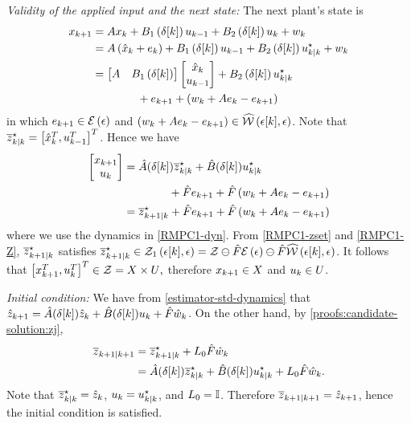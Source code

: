 \noindent\textit{Validity of the applied input and the next state:}
%
The next plant's state is 
\begin{align*}
x_{k+1} & =Ax_{k}+B_{1}\left(\delta[k]\right)u_{k-1}+B_{2}\left(\delta[k]\right)u_{k}+w_{k}\\
 & =A\left(\hat{x}_{k}+e_{k}\right)+B_{1}\left(\delta[k]\right)u_{k-1}+B_{2}\left(\delta[k]\right)u_{k| k}^{\star}+w_{k}\\
 & =\begin{bmatrix}A & B_{1}\left(\delta[k]\right)\end{bmatrix}\begin{bmatrix}\hat{x}_{k}\\
u_{k-1}
\end{bmatrix}+B_{2}\left(\delta[k]\right)u_{k| k}^{\star} \\
&\qquad\qquad + e_{k+1}+\left(w_{k}+Ae_{k}-e_{k+1}\right)
\end{align*}
in which $e_{k+1}\in\mathcal{E}\left(\epsilon\right)$ and $\left(w_{k}+Ae_{k}-e_{k+1}\right)\in\widehat{\mathcal{W}}\left(\epsilon[k],\epsilon\right)$.
Note that $\overline{z}_{k| k}^{\star}=\left[\hat{x}_{k}^{T},u_{k-1}^{T}\right]^{T}$.
Hence we have
\begin{align*}
\begin{bmatrix}x_{k+1}\\
u_{k}
\end{bmatrix} & =\hat{A}(\delta[k])\overline{z}_{k| k}^{\star}+\hat{B}(\delta[k])u_{k| k}^{\star}\\
&\qquad\qquad +\hat{F}e_{k+1}+\hat{F}\left(w_{k}+Ae_{k}-e_{k+1}\right)\\
 & =\overline{z}_{k+1| k}^{\star}+\hat{F}e_{k+1}+\hat{F}\left(w_{k}+Ae_{k}-e_{k+1}\right)
\end{align*}
where we use the dynamics in \eqref{RMPC1-dyn}. From \eqref{RMPC1-zset}
and \eqref{RMPC1-Z}, $\overline{z}_{k+1| k}^{\star}$ satisfies $\overline{z}_{k+1| k}^{\star}\in\mathcal{Z}_{1}\left(\epsilon[k],\epsilon\right)=\mathcal{Z}\ominus\hat{F}\mathcal{E}\left(\epsilon\right)\ominus\hat{F}\widehat{\mathcal{W}}\left(\epsilon[k],\epsilon\right)$.
It follows that
\(
\left[ x_{k+1}^{T}, u_{k}^{T} \right]^{T} \in \mathcal{Z} = X\times U\text{,}
\)
therefore  $x_{k+1}\in X$ and $u_{k}\in U$.


\noindent\textit{Initial condition:}
%
We have from \eqref{estimator-std-dynamics} that $\hat{z}_{k+1}=\hat{A}(\delta[k])\hat{z}_{k}+\hat{B}(\delta[k])u_{k}+\hat{F}\hat{w}_{k}$.
On the other hand, by \eqref{proofs:candidate-solution:zj},
\begin{align*}
\overline{z}_{k+1| k+1} & =\overline{z}_{k+1| k}^{\star}+L_{0}\hat{F}\hat{w}_{k}\\
 & =\hat{A}(\delta[k])\overline{z}_{k| k}^{\star}+\hat{B}(\delta[k])u_{k| k}^{\star}+L_{0}\hat{F}\hat{w}_{k}\text{.}
\end{align*}
Note that $\overline{z}_{k| k}^{\star}=\hat{z}_{k}$, $u_{k}=u_{k| k}^{\star}$,
and $L_{0}=\mathbb{I}$. Therefore $\overline{z}_{k+1| k+1}=\hat{z}_{k+1}$,
hence the initial condition is satisfied.


